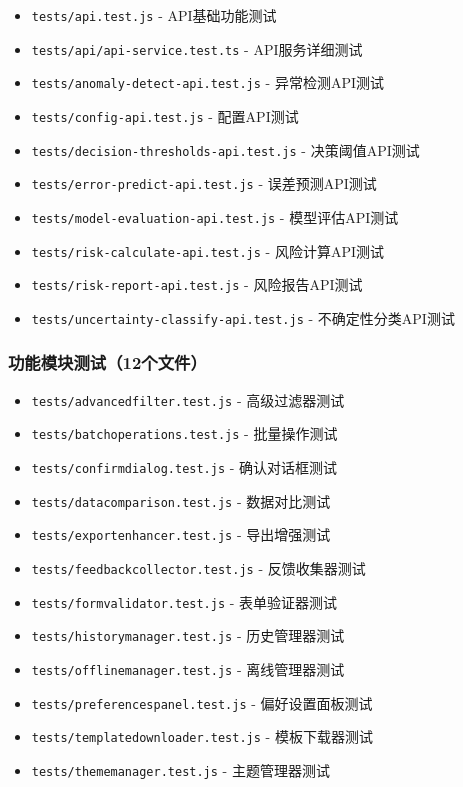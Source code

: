 \documentclass[12pt,a4paper,openany]{report}
\begin{document}
\begin{itemize}
    \item \texttt{tests/api.test.js} - API基础功能测试
    \item \texttt{tests/api/api-service.test.ts} - API服务详细测试
    \item \texttt{tests/anomaly-detect-api.test.js} - 异常检测API测试
    \item \texttt{tests/config-api.test.js} - 配置API测试
    \item \texttt{tests/decision-thresholds-api.test.js} - 决策阈值API测试
    \item \texttt{tests/error-predict-api.test.js} - 误差预测API测试
    \item \texttt{tests/model-evaluation-api.test.js} - 模型评估API测试
    \item \texttt{tests/risk-calculate-api.test.js} - 风险计算API测试
    \item \texttt{tests/risk-report-api.test.js} - 风险报告API测试
    \item \texttt{tests/uncertainty-classify-api.test.js} - 不确定性分类API测试
\end{itemize}

\subsubsection{功能模块测试（12个文件）}

\begin{itemize}
    \item \texttt{tests/advancedfilter.test.js} - 高级过滤器测试
    \item \texttt{tests/batchoperations.test.js} - 批量操作测试
    \item \texttt{tests/confirmdialog.test.js} - 确认对话框测试
    \item \texttt{tests/datacomparison.test.js} - 数据对比测试
    \item \texttt{tests/exportenhancer.test.js} - 导出增强测试
    \item \texttt{tests/feedbackcollector.test.js} - 反馈收集器测试
    \item \texttt{tests/formvalidator.test.js} - 表单验证器测试
    \item \texttt{tests/historymanager.test.js} - 历史管理器测试
    \item \texttt{tests/offlinemanager.test.js} - 离线管理器测试
    \item \texttt{tests/preferencespanel.test.js} - 偏好设置面板测试
    \item \texttt{tests/templatedownloader.test.js} - 模板下载器测试
    \item \texttt{tests/thememanager.test.js} - 主题管理器测试
\end{itemize}
\end{document}
